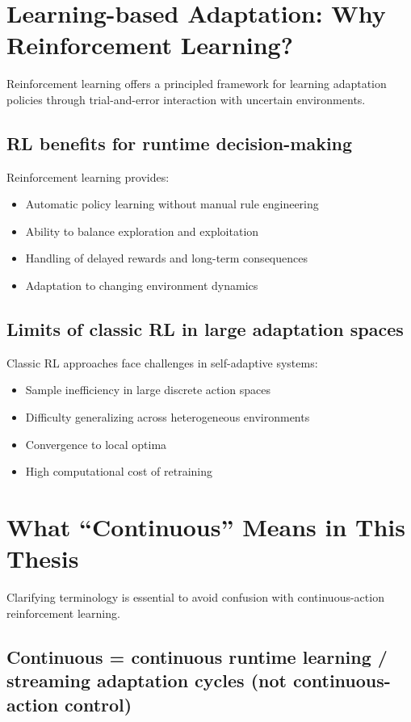 \documentclass[11pt,a4paper]{article}
\begin{document}
\section{Learning-based Adaptation: Why Reinforcement Learning?}

Reinforcement learning offers a principled framework for learning adaptation policies through trial-and-error interaction with uncertain environments.

\subsection{RL benefits for runtime decision-making}

Reinforcement learning provides:
\begin{itemize}
    \item Automatic policy learning without manual rule engineering
    \item Ability to balance exploration and exploitation
    \item Handling of delayed rewards and long-term consequences
    \item Adaptation to changing environment dynamics
\end{itemize}

\subsection{Limits of classic RL in large adaptation spaces}

Classic RL approaches face challenges in self-adaptive systems:
\begin{itemize}
    \item Sample inefficiency in large discrete action spaces
    \item Difficulty generalizing across heterogeneous environments
    \item Convergence to local optima
    \item High computational cost of retraining
\end{itemize}

\section{What ``Continuous'' Means in This Thesis}

Clarifying terminology is essential to avoid confusion with continuous-action reinforcement learning.

\subsection{Continuous = continuous runtime learning / streaming adaptation cycles (not continuous-action control)}
\end{document}
